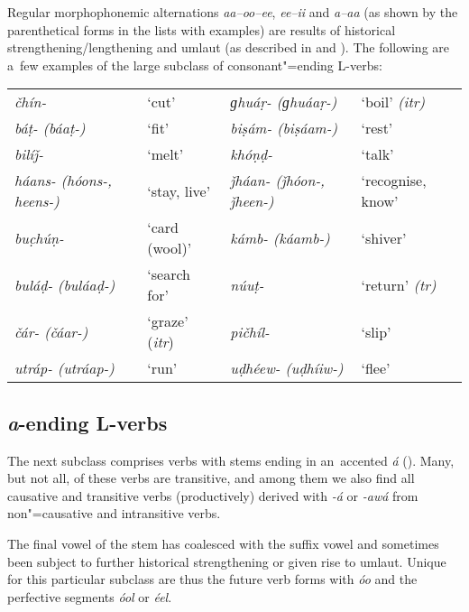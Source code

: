 Regular morphophonemic alternations \textit{aa--oo--ee}, \textit{ee--ii} and \textit{a--aa} (as shown by the parenthetical forms in the lists with examples) are results of historical strengthening/lengthening and umlaut (as described in  and ). The following are a~few examples of the large subclass of consonant"=ending L-verbs: 


\begin{table}[H]
\begin{tabularx}{\textwidth}{ Q Q Q Q }
\textit{čhín-} &
`cut' &
\textit{ɡhuáṛ- (ɡhuáaṛ-)} &
`boil' \textit{(itr)}\\
\textit{báṭ- (báaṭ-)} &
`fit' &
\textit{biṣám- (biṣáam-)} &
`rest'\\
\textit{bilíǰ-} &
`melt' &
\textit{khóṇḍ-} &
`talk'\\
\textit{háans- (hóons-, heens-)} &
`stay, live'
&
\textit{ǰháan- (ǰhóon-, ǰheen-)} &
`recognise, know'\\
\textit{buc̣húṇ-} &
`card (wool)' &
\textit{kámb- (káamb-)} &
`shiver'\\
\textit{buláḍ- (buláaḍ-)} &
`search for' &
\textit{núuṭ-} &
`return' \textit{(tr)}\\
\textit{čár- (čáar-)} &
`graze' (\textit{itr}) &
\textit{pičhíl-} &
`slip'\\
\textit{utráp- (utráap-)} &
`run' &
\textit{uḍhéew- (uḍhíiw-)} &
`flee'\\
\end{tabularx}
\end{table}


\subsection{\textit{a}-ending L-verbs}
\label{subsec:8-3-2}


The next subclass comprises verbs with stems ending in an~accented \textit{á} (). Many, but not all, of these verbs are transitive, and among them we also find all causative and transitive verbs (productively) derived with \textit{-á} or \textit{-awá} from non"=causative and intransitive verbs.


The final vowel of the stem has coalesced with the suffix vowel and sometimes been subject to further historical strengthening or given rise to umlaut. Unique for this particular subclass are thus the future verb forms with \textit{óo} and the perfective segments \textit{óol} or \textit{éel}. 


